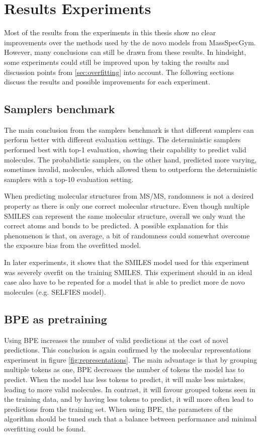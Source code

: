 \section{Results Experiments}

Most of the results from the experiments in this thesis show no clear improvements over the methods used by the de novo models from MassSpecGym.
However, many conclusions can still be drawn from these results.
In hindsight, some experiments could still be improved upon by taking the results and discussion points from \ref{sec:overfitting} into account.
The following sections discuss the results and possible improvements for each experiment.

\subsection{Samplers benchmark}

The main conclusion from the samplers benchmark is that different samplers can perform better with different evaluation settings.
The deterministic samplers performed best with top-1 evaluation, showing their capability to predict valid molecules.
The probabilistic samplers, on the other hand, predicted more varying, sometimes invalid, molecules, which allowed them to outperform the deterministic samplers with a top-10 evaluation setting.

When predicting molecular structures from \ac{MS/MS}, randomness is not a desired property as there is only one correct molecular structure.
Even though multiple SMILES can represent the same molecular structure, overall we only want the correct atoms and bonds to be predicted.
A possible explanation for this phenomenon is that, on average, a bit of randomness could somewhat overcome the exposure bias from the overfitted model.

In later experiments, it shows that the SMILES model used for this experiment was severely overfit on the training SMILES.
This experiment should in an ideal case also have to be repeated for a model that is able to predict more de novo molecules (e.g. SELFIES model).

\subsection{\ac{BPE} as pretraining}

Using \ac{BPE} increases the number of valid predictions at the cost of novel predictions. 
This conclusion is again confirmed by the molecular representations experiment in figure \ref{fig:representations}.
The main advantage is that by grouping multiple tokens as one, \ac{BPE} decreases the number of tokens the model has to predict.
When the model has less tokens to predict, it will make less mistakes, leading to more valid molecules.
In contrast, it will favour grouped tokens seen in the training data, and by having less tokens to predict, it will more often lead to predictions from the training set.
When using \ac{BPE}, the parameters of the algorithm should be tuned such that a balance between performance and minimal overfitting could be found.

